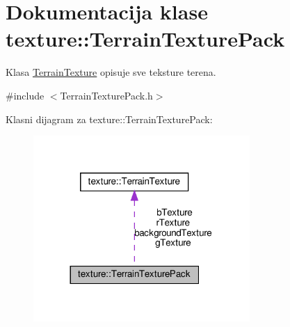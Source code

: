 \hypertarget{classtexture_1_1TerrainTexturePack}{}\section{Dokumentacija klase texture\+:\+:Terrain\+Texture\+Pack}
\label{classtexture_1_1TerrainTexturePack}


Klasa \hyperlink{classtexture_1_1TerrainTexture}{Terrain\+Texture} opisuje sve teksture terena.  




{\ttfamily \#include $<$Terrain\+Texture\+Pack.\+h$>$}



Klasni dijagram za texture\+:\+:Terrain\+Texture\+Pack\+:
\nopagebreak
\begin{figure}[H]
\begin{center}
\leavevmode
\includegraphics[width=233pt]{classtexture_1_1TerrainTexturePack__coll__graph}
\end{center}
\end{figure}
